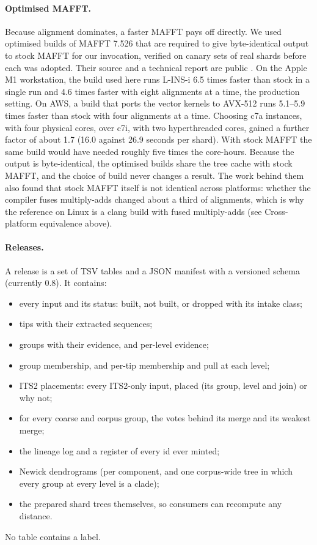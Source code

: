\documentclass[11pt,a4paper]{article}
\begin{document}
\paragraph{Optimised MAFFT.}
Because alignment dominates, a faster MAFFT pays off directly. We used optimised builds of MAFFT
7.526 that are required to give byte-identical output to stock MAFFT for our invocation, verified on
canary sets of real shards before each was adopted. Their source and a technical report are public
\citep{claude2026mafft}. On the Apple M1 workstation, the build used here runs L-INS-i 6.5 times
faster than stock in a single run and 4.6 times faster with eight alignments at a time, the
production setting. On AWS, a build that ports the vector kernels to AVX-512 runs 5.1--5.9 times
faster than stock with four alignments at a time. Choosing c7a instances, with four physical cores,
over c7i, with two hyperthreaded cores, gained a further factor of about 1.7 (16.0 against 26.9
seconds per shard). With stock MAFFT the same build would have needed roughly five times the
core-hours. Because the output is byte-identical, the optimised builds share the tree cache with
stock MAFFT, and the choice of build never changes a result. The work behind them also found that
stock MAFFT itself is not identical across platforms: whether the compiler fuses multiply-adds
changed about a third of alignments, which is why the reference on Linux is a clang build with fused
multiply-adds (see Cross-platform equivalence above).

\paragraph{Releases.}
A release is a set of TSV tables and a JSON manifest with a versioned schema (currently 0.8). It
contains:
\begin{itemize}
  \item every input and its status: built, not built, or dropped with its intake class;
  \item tips with their extracted sequences;
  \item groups with their evidence, and per-level evidence;
  \item group membership, and per-tip membership and pull at each level;
  \item ITS2 placements: every ITS2-only input, placed (its group, level and join) or why not;
  \item for every coarse and corpus group, the votes behind its merge and its weakest merge;
  \item the lineage log and a register of every id ever minted;
  \item Newick dendrograms (per component, and one corpus-wide tree in which every group at every
        level is a clade);
  \item the prepared shard trees themselves, so consumers can recompute any distance.
\end{itemize}
No table contains a label.
\end{document}
